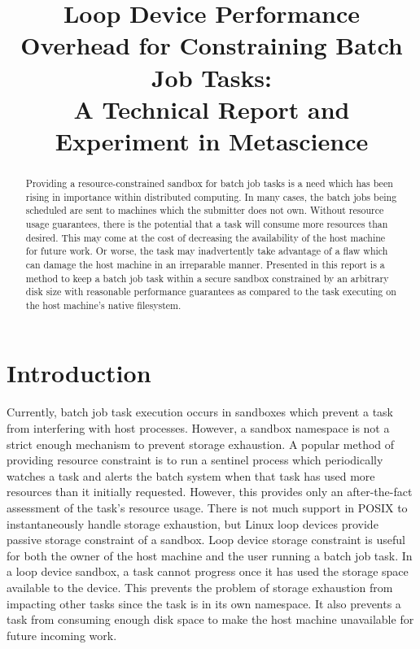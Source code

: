 \documentclass[conference]{IEEEtran}
\begin{document}
%
\title{Loop Device Performance Overhead for Constraining Batch Job Tasks:\\A Technical Report and Experiment in Metascience}


\author{
}


\maketitle


\begin{abstract}
Providing a resource-constrained sandbox for batch job tasks is a need which has been rising in importance within distributed computing. In many cases, the batch jobs being scheduled are sent to machines which the submitter does not own. Without resource usage guarantees, there is the potential that a task will consume more resources than desired. This may come at the cost of decreasing the availability of the host machine for future work. Or worse, the task may inadvertently take advantage of a flaw which can damage the host machine in an irreparable manner. Presented in this report is a method to keep a batch job task within a secure sandbox constrained by an arbitrary disk size with reasonable performance guarantees as compared to the task executing on the host machine's native filesystem.
\end{abstract}

\IEEEpeerreviewmaketitle



\section{Introduction}
Currently, batch job task execution occurs in sandboxes which prevent a task from interfering with host processes. However, a sandbox namespace is not a strict enough mechanism to prevent storage exhaustion. A popular method of providing resource constraint is to run a sentinel process which periodically watches a task and alerts the batch system when that task has used more resources than it initially requested. However, this provides only an after-the-fact assessment of the task's resource usage. There is not much support in POSIX to instantaneously handle storage exhaustion, but Linux loop devices provide passive storage constraint of a sandbox. Loop device storage constraint is useful for both the owner of the host machine and the user running a batch job task. In a loop device sandbox, a task cannot progress once it has used the storage space available to the device. This prevents the problem of storage exhaustion from impacting other tasks since the task is in its own namespace. It also prevents a task from consuming enough disk space to make the host machine unavailable for future incoming work.
\end{document}
